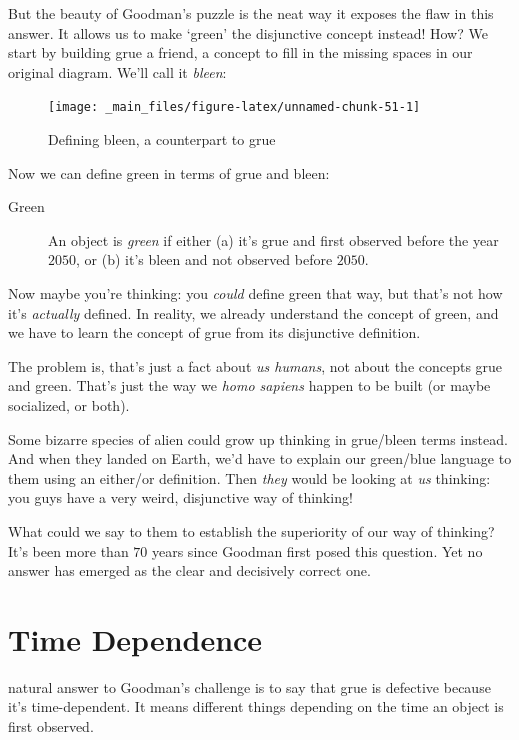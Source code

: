 \documentclass[justified]{tufte-book}
\begin{document}
But the beauty of Goodman's puzzle is the neat way it exposes the flaw in this answer. It allows us to make `green' the disjunctive concept instead! How? We start by building grue a friend, a concept to fill in the missing spaces in our original diagram. We'll call it \emph{bleen}:

\begin{figure}
\texttt{[image: \_main\_files/figure-latex/unnamed-chunk-51-1]} \caption[Defining bleen, a counterpart to grue]{Defining bleen, a counterpart to grue}\label{fig:unnamed-chunk-51}
\end{figure}

Now we can define green in terms of grue and bleen:

\begin{description}
\item[Green]
An object is \emph{green} if either (a) it's grue and first observed before the year \(2050\), or (b) it's bleen and not observed before \(2050\).
\end{description}

Now maybe you're thinking: you \emph{could} define green that way, but that's not how it's \emph{actually} defined. In reality, we already understand the concept of green, and we have to learn the concept of grue from its disjunctive definition.

The problem is, that's just a fact about \emph{us humans}, not about the concepts grue and green. That's just the way we \emph{homo sapiens} happen to be built (or maybe socialized, or both).

Some bizarre species of alien could grow up thinking in grue/bleen terms instead. And when they landed on Earth, we'd have to explain our green/blue language to them using an either/or definition. Then \emph{they} would be looking at \emph{us} thinking: you guys have a very weird, disjunctive way of thinking!

What could we say to them to establish the superiority of our way of thinking? It's been more than \(70\) years since Goodman first posed this question. Yet no answer has emerged as the clear and decisively correct one.

\hypertarget{time-dependence}{%
\section*{Time Dependence}\label{time-dependence}}

 natural answer to Goodman's challenge is to say that grue is defective because it's time-dependent. It means different things depending on the time an object is first observed.
\end{document}

